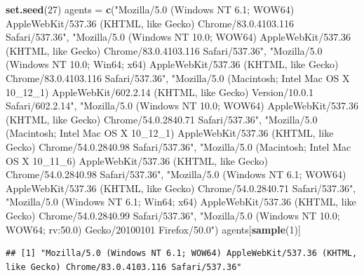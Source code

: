 \documentclass[
  12pt,
  a4paper,
  oneside]{book}
\newenvironment{Shaded}{\begin{snugshade}}{\end{snugshade}}
\newcommand{\DecValTok}[1]{\textcolor[rgb]{0.00,0.00,0.81}{#1}}
\newcommand{\KeywordTok}[1]{\textcolor[rgb]{0.13,0.29,0.53}{\textbf{#1}}}
\newcommand{\NormalTok}[1]{#1}
\newcommand{\StringTok}[1]{\textcolor[rgb]{0.31,0.60,0.02}{#1}}
\theoremstyle{definition}
\theoremstyle{definition}
\theoremstyle{definition}
\theoremstyle{remark}
\begin{document}
\begin{Shaded}
\begin{Highlighting}[]
\KeywordTok{set.seed}\NormalTok{(}\DecValTok{27}\NormalTok{)}
\NormalTok{agents =}\StringTok{ }\KeywordTok{c}\NormalTok{(}\StringTok{"Mozilla/5.0 (Windows NT 6.1; WOW64) AppleWebKit/537.36 (KHTML, like Gecko) Chrome/83.0.4103.116 Safari/537.36"}\NormalTok{, }
    \StringTok{"Mozilla/5.0 (Windows NT 10.0; WOW64) AppleWebKit/537.36 (KHTML, like Gecko) Chrome/83.0.4103.116 Safari/537.36"}\NormalTok{, }
    \StringTok{"Mozilla/5.0 (Windows NT 10.0; Win64; x64) AppleWebKit/537.36 (KHTML, like Gecko) Chrome/83.0.4103.116 Safari/537.36"}\NormalTok{, }
    \StringTok{"Mozilla/5.0 (Macintosh; Intel Mac OS X 10_12_1) AppleWebKit/602.2.14 (KHTML, like Gecko) Version/10.0.1 Safari/602.2.14"}\NormalTok{, }
    \StringTok{"Mozilla/5.0 (Windows NT 10.0; WOW64) AppleWebKit/537.36 (KHTML, like Gecko) Chrome/54.0.2840.71 Safari/537.36"}\NormalTok{, }
    \StringTok{"Mozilla/5.0 (Macintosh; Intel Mac OS X 10_12_1) AppleWebKit/537.36 (KHTML, like Gecko) Chrome/54.0.2840.98 Safari/537.36"}\NormalTok{, }
    \StringTok{"Mozilla/5.0 (Macintosh; Intel Mac OS X 10_11_6) AppleWebKit/537.36 (KHTML, like Gecko) Chrome/54.0.2840.98 Safari/537.36"}\NormalTok{, }
    \StringTok{"Mozilla/5.0 (Windows NT 6.1; WOW64) AppleWebKit/537.36 (KHTML, like Gecko) Chrome/54.0.2840.71 Safari/537.36"}\NormalTok{, }
    \StringTok{"Mozilla/5.0 (Windows NT 6.1; Win64; x64) AppleWebKit/537.36 (KHTML, like Gecko) Chrome/54.0.2840.99 Safari/537.36"}\NormalTok{, }
    \StringTok{"Mozilla/5.0 (Windows NT 10.0; WOW64; rv:50.0) Gecko/20100101 Firefox/50.0"}\NormalTok{)}
\NormalTok{agents[}\KeywordTok{sample}\NormalTok{(}\DecValTok{1}\NormalTok{)]}
\end{Highlighting}
\end{Shaded}

\begin{verbatim}
## [1] "Mozilla/5.0 (Windows NT 6.1; WOW64) AppleWebKit/537.36 (KHTML, like Gecko) Chrome/83.0.4103.116 Safari/537.36"
\end{verbatim}
\end{document}
